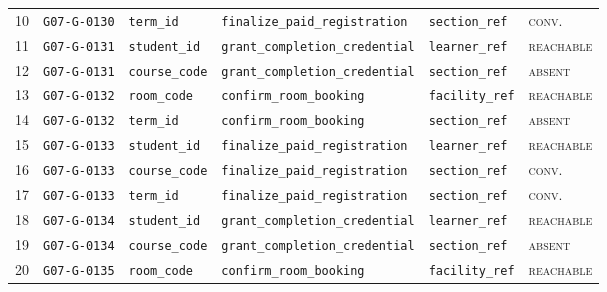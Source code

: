 \documentclass[11pt]{article}
\newcommand{\st}[1]{\textsc{\small #1}}
\begin{document}
\begin{longtable}{@{}rlllll@{}}
\footnotesize 10 & \texttt{\footnotesize G07-G-0130} & \texttt{\footnotesize term\_id} & \texttt{\footnotesize finalize\_paid\_registration} & \texttt{\footnotesize section\_ref} & \st{conv.} \\
\footnotesize 11 & \texttt{\footnotesize G07-G-0131} & \texttt{\footnotesize student\_id} & \texttt{\footnotesize grant\_completion\_credential} & \texttt{\footnotesize learner\_ref} & \st{reachable} \\
\footnotesize 12 & \texttt{\footnotesize G07-G-0131} & \texttt{\footnotesize course\_code} & \texttt{\footnotesize grant\_completion\_credential} & \texttt{\footnotesize section\_ref} & \st{absent} \\
\footnotesize 13 & \texttt{\footnotesize G07-G-0132} & \texttt{\footnotesize room\_code} & \texttt{\footnotesize confirm\_room\_booking} & \texttt{\footnotesize facility\_ref} & \st{reachable} \\
\footnotesize 14 & \texttt{\footnotesize G07-G-0132} & \texttt{\footnotesize term\_id} & \texttt{\footnotesize confirm\_room\_booking} & \texttt{\footnotesize section\_ref} & \st{absent} \\
\footnotesize 15 & \texttt{\footnotesize G07-G-0133} & \texttt{\footnotesize student\_id} & \texttt{\footnotesize finalize\_paid\_registration} & \texttt{\footnotesize learner\_ref} & \st{reachable} \\
\footnotesize 16 & \texttt{\footnotesize G07-G-0133} & \texttt{\footnotesize course\_code} & \texttt{\footnotesize finalize\_paid\_registration} & \texttt{\footnotesize section\_ref} & \st{conv.} \\
\footnotesize 17 & \texttt{\footnotesize G07-G-0133} & \texttt{\footnotesize term\_id} & \texttt{\footnotesize finalize\_paid\_registration} & \texttt{\footnotesize section\_ref} & \st{conv.} \\
\footnotesize 18 & \texttt{\footnotesize G07-G-0134} & \texttt{\footnotesize student\_id} & \texttt{\footnotesize grant\_completion\_credential} & \texttt{\footnotesize learner\_ref} & \st{reachable} \\
\footnotesize 19 & \texttt{\footnotesize G07-G-0134} & \texttt{\footnotesize course\_code} & \texttt{\footnotesize grant\_completion\_credential} & \texttt{\footnotesize section\_ref} & \st{absent} \\
\footnotesize 20 & \texttt{\footnotesize G07-G-0135} & \texttt{\footnotesize room\_code} & \texttt{\footnotesize confirm\_room\_booking} & \texttt{\footnotesize facility\_ref} & \st{reachable} \\

\end{longtable}
\end{document}
